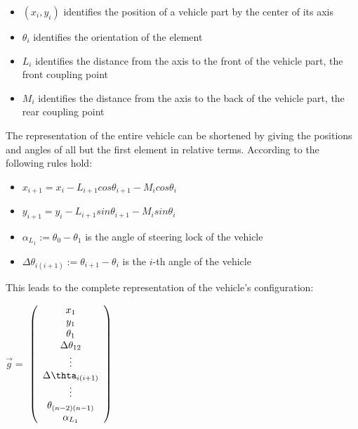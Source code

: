 \begin{itemize}
	\item $(x_i,y_i)$ identifies the position of a vehicle part by the center of its axis
	\item $\theta_i$ identifies the orientation of the element
	\item $L_i$ identifies the distance from the axis to the front of the vehicle part, the front coupling point
	\item $M_i$ identifies the distance from the axis to the back of the vehicle part, the rear coupling point
\end{itemize}

The representation of the entire vehicle can be shortened by giving the positions and angles of all but the first element in relative terms. According to \cite{28} the following rules hold:
\begin{itemize}
	\item $x_{i+1}=x_i-L_{i+1} cos \theta_{i+1}-M_i cos \theta_i$
	\item $y_{i+1}=y_i-L_{i+1} sin \theta_{i+1}-M_i sin \theta_i$
	\item $\alpha_{L_1}:=\theta_0-\theta_1$ is the angle of steering lock of the vehicle
	\item $\Delta \theta_{i(i+1)}:= \theta_{i+1}-\theta_i$ is the $i$-th angle of the vehicle
\end{itemize}

This leads to the complete representation of the vehicle's configuration:
\begin{center}
$\vec{g}=$
$\left(
	\begin{array}{c}
		x_1\\
		y_1\\
		\theta_1\\
		\Delta \theta_{12}\\
		\vdots\\
		\Delta \thta_{i(i+1)}\\
		\vdots\\
		\theta_{(n-2)(n-1)}\\
		\alpha_{L_1} 
	\end{array}
\right)$
\end{center}


